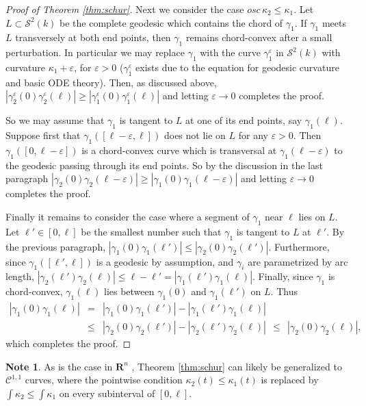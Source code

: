\documentclass[11pt]{amsart}
\theoremstyle{definition}
\newtheorem{note}[theorem]{Note}
\newcommand{\R}{\mathbf{R}}
\newcommand{\C}{\mathcal{C}}
\renewcommand{\epsilon}{\varepsilon}
\begin{document}
\begin{proof}[Proof of Theorem \ref{thm:schur}]
Next we consider the case ${osc\,\kappa_2}\leq \kappa_1$. Let $L\subset\mathcal{S}^2(k)$ be the complete geodesic which contains the chord of $\gamma_1$. If $\gamma_1$ meets $L$ transversely at both end points, then $\gamma_1$ remains chord-convex after a small perturbation. In particular we may replace $\gamma_1$ with the curve $\gamma_1^\epsilon$ in $\mathcal{S}^2(k)$ with curvature $\kappa_1+\epsilon$, for $\epsilon>0$ ($\gamma_1^\epsilon$ exists due to the equation for geodesic curvature and basic ODE theory). Then, as discussed above, $|\gamma_2^\epsilon(0)\gamma_2^\epsilon(\ell)|\geq |\gamma_1^\epsilon(0)\gamma_1^\epsilon(\ell)|$ and letting $\epsilon\to 0$ completes the proof. 

So we may assume that $\gamma_1$ is tangent to $L$ at one of its end points, say $\gamma_1(\ell)$. Suppose first  that $\gamma_1([\ell-{\epsilon}, \ell])$ does not lie on $L$ for any $\epsilon>0$. Then $\gamma_1([0, \ell-\epsilon])$  is a chord-convex curve which is transversal at $\gamma_1(\ell-\epsilon)$ to the geodesic passing through its end points.
So by the discussion in the last paragraph $|\gamma_2(0)\gamma_2(\ell-\epsilon)|\geq |\gamma_1(0)\gamma_1(\ell-\epsilon)|$ and letting $\epsilon\to 0$ completes the proof. 


Finally it remains to consider the case where  a segment of $\gamma_1$ near $\ell$ lies on $L$. Let $\ell'\in[0,\ell]$ be 
 the smallest number such that $\gamma_1$ is tangent to $L$ at  $\ell'$. By the previous paragraph, 
$
 |\gamma_1(0)\gamma_1(\ell')|\leq |\gamma_2(0)\gamma_2(\ell')|.
$
Furthermore, since $\gamma_1([\ell',\ell])$ is a geodesic by assumption, and $\gamma_i$ are parametrized by arc length, 
$
|\gamma_2(\ell')\gamma_2(\ell)|\leq \ell-\ell'=|\gamma_1(\ell')\gamma_1(\ell)|.
$
Finally, since $\gamma_1$ is chord-convex, $\gamma_1(\ell)$  lies between $\gamma_1(0)$ and $\gamma_1(\ell')$ on $L$. Thus
\begin{eqnarray*}
|\gamma_1(0)\gamma_1(\ell)| &=& |\gamma_1(0)\gamma_1(\ell')|-|\gamma_1(\ell')\gamma_1(\ell)|\\
&\leq& |\gamma_2(0)\gamma_2(\ell')|-|\gamma_2(\ell')\gamma_2(\ell)| \,\;\leq\;\, |\gamma_2(0)\gamma_2(\ell)|,
\end{eqnarray*}
which completes the proof.
\end{proof}

\begin{note}\label{note:schur}
As is the case in $\R^n$ \cite{sullivan2008}, Theorem \ref{thm:schur} can likely be generalized to $\C^{1,1}$ curves, where the pointwise condition $\kappa_2(t)\leq\kappa_1(t)$ is replaced by $\int\kappa_2\le\int\kappa_1$ on every subinterval of $[0,\ell]$.
\end{note}
\end{document}
